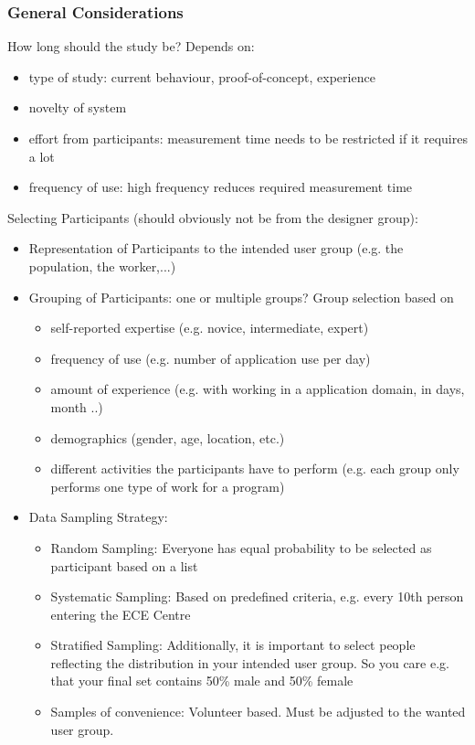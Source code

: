 \subsubsection{General Considerations}
How long should the study be? Depends on:
\begin{itemize}
\item type of study: current behaviour, proof-of-concept, experience
\item novelty of system
\item effort from participants: measurement time needs to be restricted if it requires a lot
\item frequency of use: high frequency reduces required measurement time
\end{itemize}
Selecting Participants (should obviously not be from the designer group):
\begin{itemize}
\item Representation of Participants to the intended user group (e.g. the population, the worker,...)
\item Grouping of Participants: one or multiple groups? Group selection based on
\begin{itemize}
\item self-reported expertise (e.g. novice, intermediate, expert)
\item frequency of use (e.g. number of application use per day)
\item amount of experience (e.g. with working in a application domain, in days, month ..)
\item demographics (gender, age, location, etc.)
\item different activities the participants have to perform (e.g. each group only performs one type of work for a
program)
\end{itemize}
\item Data Sampling Strategy:
\begin{itemize}
\item Random Sampling: Everyone has equal probability to be selected as participant based on a list
\item Systematic Sampling: Based on predefined criteria, e.g. every 10th person entering the ECE Centre
\item Stratified Sampling: Additionally, it is important to select people reflecting the distribution in your intended user group. So you care e.g. that your final set contains 50\% male and 50\% female
\item Samples of convenience: Volunteer based. Must be adjusted to the wanted user group.
\end{itemize}
\end{itemize}
